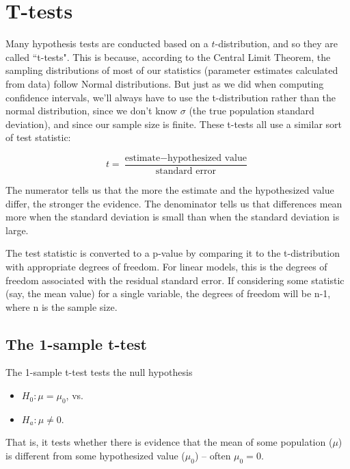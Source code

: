 \documentclass[twoside]{book}\usepackage[]{graphicx}\usepackage[]{xcolor}
\begin{document}
\section{T-tests}

Many hypothesis tests are conducted based on a $t$-distribution, and so they are called ``t-tests". This is because, according to the Central Limit Theorem, the sampling distributions of most of our statistics (parameter estimates calculated from data) follow Normal distributions.  But just as we did when computing confidence intervals, we'll always have to use the t-distribution rather than the normal distribution, since we don't know $\sigma$ (the true population standard deviation), and since our sample size is finite.   These t-tests all use a similar sort
of test statistic:

\[
t = \frac{\mbox{estimate} - \mbox{hypothesized value}}{\mbox{standard error}}
\]

The numerator tells us that the more the estimate and the hypothesized value differ, 
the stronger the evidence.  The denominator tells us that differences mean more when the standard
deviation is small than when the standard deviation is large.

The test statistic is converted to a p-value by comparing it to the t-distribution with appropriate
degrees of freedom.  For linear models, this is the degrees of freedom associated with the 
residual standard error.  If considering some statistic (say, the mean value) for a single variable, the degrees of freedom will be n-1, where n is the sample size.

\subsection{The 1-sample t-test}
The 1-sample t-test tests the null hypothesis
\begin{itemize}
	\item $H_0: \mu = \mu_0$, vs.
	\item $H_a: \mu \neq 0$.
\end{itemize}
That is, it tests whether there is evidence that the mean of some population ($\mu$) is different
from some hypothesized value ($\mu_0$) -- often $\mu_0 = 0$.
\end{document}
